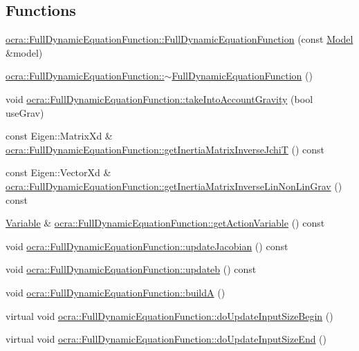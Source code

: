 \subsection*{Functions}
\begin{DoxyCompactItemize}
\item 
\hyperlink{group__constraint_ga778bffa6d85a494b3ee0c499400573a6}{ocra\+::\+Full\+Dynamic\+Equation\+Function\+::\+Full\+Dynamic\+Equation\+Function} (const \hyperlink{classocra_1_1Model}{Model} \&model)
\item 
\hyperlink{group__constraint_gab3c2d35bef3c4d8733b7ab0e9ff48bfc}{ocra\+::\+Full\+Dynamic\+Equation\+Function\+::$\sim$\+Full\+Dynamic\+Equation\+Function} ()
\item 
void \hyperlink{group__constraint_ga673fd9a47a249d84ce527011a06417aa}{ocra\+::\+Full\+Dynamic\+Equation\+Function\+::take\+Into\+Account\+Gravity} (bool use\+Grav)
\item 
const Eigen\+::\+Matrix\+Xd \& \hyperlink{group__constraint_gaf5eec6352d53ef9682fa281f2692add2}{ocra\+::\+Full\+Dynamic\+Equation\+Function\+::get\+Inertia\+Matrix\+Inverse\+JchiT} () const 
\item 
const Eigen\+::\+Vector\+Xd \& \hyperlink{group__constraint_ga3ac88fe8128c6ceb390057abb933e602}{ocra\+::\+Full\+Dynamic\+Equation\+Function\+::get\+Inertia\+Matrix\+Inverse\+Lin\+Non\+Lin\+Grav} () const 
\item 
\hyperlink{classocra_1_1Variable}{Variable} \& \hyperlink{group__constraint_gaab7728b0f686c4ae63784c4a72871f13}{ocra\+::\+Full\+Dynamic\+Equation\+Function\+::get\+Action\+Variable} () const 
\item 
void \hyperlink{group__constraint_gab601abcc9508d55da24d1a1fa7332281}{ocra\+::\+Full\+Dynamic\+Equation\+Function\+::update\+Jacobian} () const 
\item 
void \hyperlink{group__constraint_gae2cb2e75b8cdb7bdb71e37bdbcabb156}{ocra\+::\+Full\+Dynamic\+Equation\+Function\+::updateb} () const 
\item 
void \hyperlink{group__constraint_ga19d9bbe4f78b4c396930388a70b8cd4b}{ocra\+::\+Full\+Dynamic\+Equation\+Function\+::buildA} ()
\item 
virtual void \hyperlink{group__constraint_gadbdce52af8ba057e93ea923db5a3ce04}{ocra\+::\+Full\+Dynamic\+Equation\+Function\+::do\+Update\+Input\+Size\+Begin} ()
\item 
virtual void \hyperlink{group__constraint_ga8c14a0ff3f87c32d030a3a1753b7a77e}{ocra\+::\+Full\+Dynamic\+Equation\+Function\+::do\+Update\+Input\+Size\+End} ()
\end{DoxyCompactItemize}


